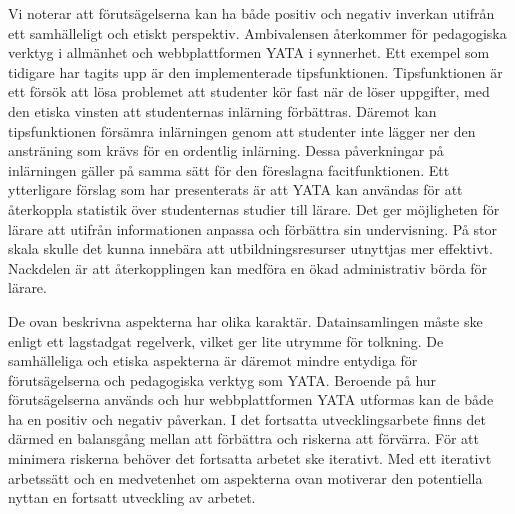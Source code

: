 Vi noterar att förutsägelserna kan ha både positiv och negativ inverkan utifrån ett samhälleligt och etiskt perspektiv. Ambivalensen återkommer för pedagogiska verktyg i allmänhet och webbplattformen YATA i synnerhet. Ett exempel som tidigare har tagits upp är den implementerade tipsfunktionen. Tipsfunktionen är ett försök att lösa problemet att studenter kör fast när de löser uppgifter, med den etiska vinsten att studenternas inlärning förbättras. Däremot kan tipsfunktionen försämra inlärningen genom att studenter inte lägger ner den ansträning som krävs för en ordentlig inlärning. Dessa påverkningar på inlärningen gäller på samma sätt för den föreslagna facitfunktionen. Ett ytterligare förslag som har presenterats är att YATA kan användas för att återkoppla statistik över studenternas studier till lärare. Det ger möjligheten för lärare att utifrån informationen anpassa och förbättra sin undervisning. På stor skala skulle det kunna innebära att utbildningsresurser utnyttjas mer effektivt. Nackdelen är att återkopplingen kan medföra en ökad administrativ börda för lärare.



De ovan beskrivna aspekterna har olika karaktär. Datainsamlingen måste ske enligt ett lagstadgat regelverk, vilket ger lite utrymme för tolkning. De samhälleliga och etiska aspekterna är däremot mindre entydiga för förutsägelserna och pedagogiska verktyg som YATA. Beroende på hur förutsägelserna används och hur webbplattformen YATA utformas kan de både ha en positiv och negativ påverkan. I det fortsatta utvecklingsarbete finns det därmed en balansgång mellan att förbättra och riskerna att förvärra. För att minimera riskerna behöver det fortsatta arbetet ske iterativt. Med ett iterativt arbetssätt och en medvetenhet om aspekterna ovan motiverar den potentiella nyttan en fortsatt utveckling av arbetet.
